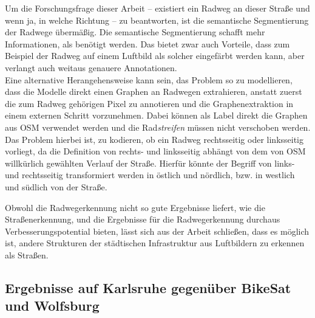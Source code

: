\begin{enumerate}
	Um die Forschungsfrage dieser Arbeit -- existiert ein Radweg an dieser Straße und wenn ja, in welche Richtung -- 
	zu beantworten, ist die semantische Segmentierung der Radwege übermäßig. Die semantische Segmentierung 
	schafft mehr Informationen, als benötigt werden. Das bietet zwar auch Vorteile, dass zum Beispiel der Radweg 
	auf einem Luftbild als solcher eingefärbt werden kann, aber verlangt auch weitaus genauere Annotationen. \\
	Eine alternative Herangehensweise kann sein, das Problem so zu modellieren, dass die Modelle direkt einen Graphen
	an Radwegen extrahieren, anstatt zuerst die zum Radweg gehörigen Pixel zu annotieren und die Graphenextraktion 
	in einem externen Schritt vorzunehmen. Dabei können als Label direkt die Graphen aus \ac{OSM} verwendet werden 
	und die Rad\textit{streifen} müssen nicht verschoben werden. Das Problem hierbei ist, zu kodieren, ob 
	ein Radweg rechtsseitig oder linksseitig vorliegt, da die Definition von rechts- und linksseitig abhängt  
	von dem von \ac{OSM} willkürlich gewählten Verlauf der Straße. Hierfür könnte der Begriff von links- und 
	rechtsseitig transformiert werden in östlich und nördlich, bzw. in westlich und südlich von der Straße.    
\end{enumerate}
Obwohl die Radwegerkennung nicht so gute Ergebnisse liefert, wie die Straßenerkennung, und die Ergebnisse 
für die Radwegerkennung durchaus Verbesserungspotential bieten, lässt sich aus der Arbeit 
schließen, dass es möglich ist, andere Strukturen der städtischen Infrastruktur aus Luftbildern zu erkennen 
als Straßen. 

\subsection{Ergebnisse auf Karlsruhe gegenüber BikeSat und Wolfsburg}

